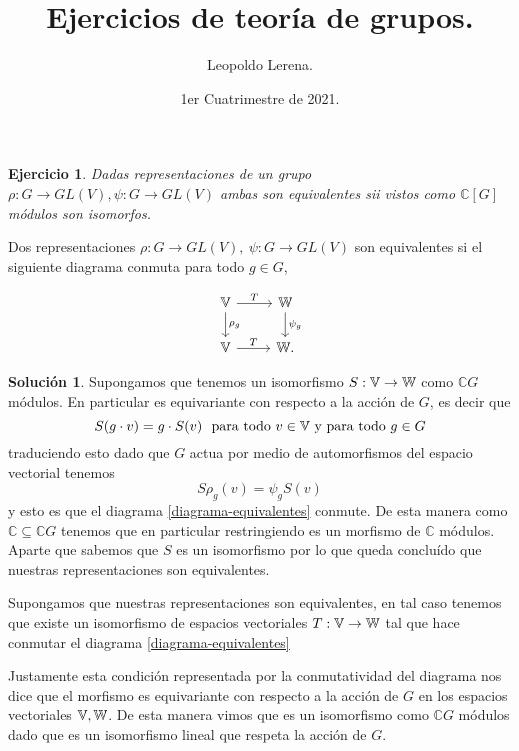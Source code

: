 \documentclass[12pt]{article}
\title{\color{red!55!black} Ejercicios de teoría de grupos.}
\author{Leopoldo Lerena.}
\date{1er Cuatrimestre de 2021.}
\theoremstyle{plain}
\newtheorem{ej}{Ejercicio}
\theoremstyle{definition}
\newtheorem*{sol}{Solución}
\theoremstyle{remark}
\newcommand\CC{\mathbb{C}}
\begin{document}
\maketitle

\medskip
\begin{tcolorbox}[colback=teal!25!white,colframe=teal!75!black]
\begin{ej}
	Dadas representaciones de un grupo $\rho: G \to GL(V), \psi: G \to GL(V)$ ambas son equivalentes sii vistos como $\CC[G]$ módulos son isomorfos.
\end{ej}	
\end{tcolorbox}
\medskip

Dos representaciones $\rho: G \to GL(V), \  \psi: G \to GL(V)$ son equivalentes si el siguiente diagrama conmuta para todo $g \in G$,

\begin{equation}\label{diagrama-equivalentes}
\begin{tikzcd}
\Bbb V  \arrow{d}{\rho_g} \arrow{r}{T}   &  \Bbb W \arrow{d}{\psi_g}  \\
\Bbb V \arrow{r}{T}     &  \Bbb W .
\end{tikzcd}
\end{equation}
\medskip
\begin{sol}	
	Supongamos que tenemos un isomorfismo $S: \Bbb V \to \Bbb W$ como $\CC G$ módulos. En particular es equivariante con respecto a la acción de $G$, es decir que 
	\[
	S(g \cdot v) = g \cdot S(v) \ \  \text{para todo} \ v \in \Bbb V \ \text{y para todo} \ g \in G
	\]
	traduciendo esto dado que $G$ actua por medio de automorfismos del espacio vectorial tenemos 
	\[
	S \rho_g (v) = \psi_g S(v)
	\]
	y esto es que el diagrama \ref{diagrama-equivalentes} conmute.  De esta manera como $\CC \subseteq \CC G$ tenemos que en particular restringiendo es un morfismo de $\CC$ módulos. Aparte que sabemos que $S$ es un isomorfismo por lo que queda concluído que nuestras representaciones son equivalentes.
	
	Supongamos que nuestras representaciones son equivalentes, en tal caso tenemos que existe un isomorfismo de espacios vectoriales $T: \Bbb V \to \Bbb W$ tal que hace conmutar el diagrama \ref{diagrama-equivalentes}
	
	Justamente esta condición representada por la conmutatividad del diagrama nos dice que el morfismo es equivariante con respecto a la acción de $G$ en los espacios vectoriales $\Bbb V, \Bbb W$. De esta manera vimos que es un isomorfismo como $\CC G$ módulos dado que es un isomorfismo lineal que respeta la acción de $G$.
\end{sol}
\end{document}
